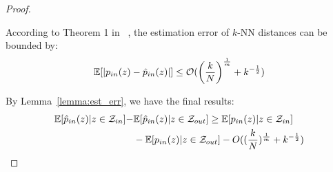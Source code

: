 \begin{proof}
\begin{lemma}
According to Theorem 1 in ~\cite{zhao2022analysis}, the estimation error of $k$-NN distances can be bounded by:
$$
\mathbb{E}[|p_{in}(\*z) - \hat{p}_{in}(\*z)|]  \leq \mathcal{O}(\left(\frac{k}{N}\right)^{\frac{1}{m}} + k^{-\frac{1}{2}})
$$
\label{lemma:est_err}
\end{lemma}
By Lemma~\ref{lemma:est_err}, we have the final results: 
\begin{align*}
     \mathbb{E}[\hat{p}_{in}(\*z)|{\*z \in \mathcal{Z}_{in}}] - & \mathbb{E}[\hat{p}_{in}(\*z)|{\*z \in \mathcal{Z}_{out}}] \geq \mathbb{E}[p_{in}(\*z)|{\*z \in \mathcal{Z}_{in}} ] \\
     &- \mathbb{E}[p_{in}(\*z)|{\*z \in \mathcal{Z}_{out}}] - O((\frac{k}{N})^{\frac{1}{m}} + k^{-\frac{1}{2}})
\end{align*}

\end{proof}

